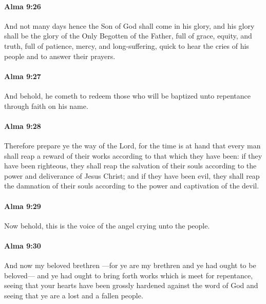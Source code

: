 		\paragraph{Alma 9:26} %
			\label{ALMA-9-26}

			And not many days hence the Son of God shall come in his glory,
			and his glory shall be the glory of the Only Begotten of the Father,
			full of grace, equity, and truth,
			full of patience, mercy, and long-suffering,
			quick to hear the cries of his people and to answer their prayers.

		\paragraph{Alma 9:27} %
			\label{ALMA-9-27}

			And behold, he cometh to redeem those who will be baptized
			unto repentance through faith on his name.

		\paragraph{Alma 9:28} %
			\label{ALMA-9-28}

			Therefore prepare ye the way of the Lord,
			for the time is at hand that every man shall reap a reward of their works
			according to that which they have been:
			if they have been righteous,
			they shall reap the salvation of their souls
			according to the power and deliverance of Jesus Christ;
			and if they have been evil,
			they shall reap the damnation of their souls
			according to the power and captivation of the devil.

		\paragraph{Alma 9:29} %
			\label{ALMA-9-29}

			Now behold, this is the voice of the angel crying unto the people.

		\paragraph{Alma 9:30} %
			\label{ALMA-9-30}

			And now my beloved brethren
			---for ye are my brethren
			and ye had ought to be beloved---
			and ye had ought to bring forth works which is meet for repentance,
			seeing that your hearts have been grossly hardened against the word of God
			and seeing that ye are a lost and a fallen people.

